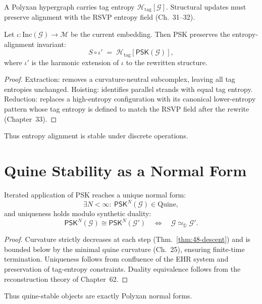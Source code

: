 A Polyxan hypergraph carries tag entropy $\mathcal{H}_{\mathrm{tag}}[\mathcal{G}]$.  
Structural updates must preserve alignment with the RSVP entropy field (Ch.~31--32).

\begin{theorem}\label{thm:48-entropy}
Let $\iota:\mathrm{Inc}(\mathcal{G})\to\mathcal{M}$ be the current embedding.  
Then PSK preserves the entropy-alignment invariant:
\[
S\circ\iota' \;=\; \mathcal{H}_{\mathrm{tag}}[\mathsf{PSK}(\mathcal{G})],
\]
where $\iota'$ is the harmonic extension of $\iota$ to the rewritten structure.
\end{theorem}

\begin{proof}
Extraction: removes a curvature-neutral subcomplex, leaving all tag entropies unchanged.  
Hoisting: identifies parallel strands with equal tag entropy.  
Reduction: replaces a high-entropy configuration with its canonical lower-entropy pattern whose tag entropy is defined to match the RSVP field after the rewrite (Chapter~33).  
\end{proof}

Thus entropy alignment is stable under discrete operations.

\section{Quine Stability as a Normal Form}

\begin{theorem}\label{thm:48-normal}
Iterated application of PSK reaches a unique normal form:
\[
\exists N < \infty:\ \mathsf{PSK}^N(\mathcal{G}) \in \mathrm{Quine},
\]
and uniqueness holds modulo synthetic duality:
\[
\mathsf{PSK}^N(\mathcal{G})
\cong
\mathsf{PSK}^N(\mathcal{G}')
\quad\Longleftrightarrow\quad
\mathcal{G} \simeq_{\mathbb{D}} \mathcal{G}'.
\]
\end{theorem}

\begin{proof}
Curvature strictly decreases at each step (Thm.~\ref{thm:48-descent}) and is bounded below by the minimal quine curvature (Ch.~25), ensuring finite-time termination.  
Uniqueness follows from confluence of the EHR system and preservation of tag-entropy constraints.  
Duality equivalence follows from the reconstruction theory of Chapter~62.
\end{proof}

Thus quine-stable objects are exactly Polyxan normal forms.

